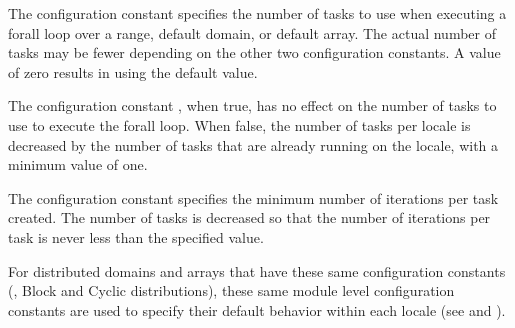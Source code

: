 The configuration constant  specifies the
number of tasks to use when executing a forall loop over a range,
default domain, or default array.  The actual number of tasks may be
fewer depending on the other two configuration constants.  A value of
zero results in using the default value.

The configuration constant , when
true, has no effect on the number of tasks to use to execute the
forall loop.  When false, the number of tasks per locale is decreased
by the number of tasks that are already running on the locale, with a
minimum value of one.

The configuration constant  specifies the
minimum number of iterations per task created.  The number of tasks is
decreased so that the number of iterations per task is never less than
the specified value.

For distributed domains and arrays that have these same configuration
constants (\eg, Block and Cyclic distributions), these same
module level configuration constants are used to specify their
default behavior within each locale
(see  and ).
